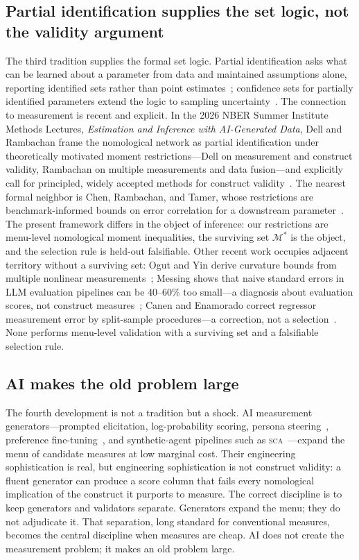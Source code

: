 \documentclass[10pt,letterpaper]{article}
\newcommand{\SCA}{\textsc{sca}}
\newcommand{\M}{\ensuremath{\mathcal{M}}}
\begin{document}
\subsection{Partial identification supplies the set logic, not the validity argument}
The third tradition supplies the formal set logic.
Partial identification asks what can be learned about a parameter from data and maintained assumptions alone, reporting identified sets rather than point estimates~\cite{manski2003,molinari2020}; confidence sets for partially identified parameters extend the logic to sampling uncertainty~\cite{imbensmanski2004,stoye2009}.
The connection to measurement is recent and explicit.
In the 2026 NBER Summer Institute Methods Lectures, \emph{Estimation and Inference with AI-Generated Data}, Dell and Rambachan frame the nomological network as partial identification under theoretically motivated moment restrictions---Dell on measurement and construct validity, Rambachan on multiple measurements and data fusion---and explicitly call for principled, widely accepted methods for construct validity~\cite{dellrambachan2026}.
The nearest formal neighbor is Chen, Rambachan, and Tamer, whose restrictions are benchmark-informed bounds on error correlation for a downstream parameter~\cite{chenrttamer2026}.
The present framework differs in the object of inference: our restrictions are menu-level nomological moment inequalities, the surviving set $\M^*$ is the object, and the selection rule is held-out falsifiable.
Other recent work occupies adjacent territory without a surviving set: Ogut and Yin derive curvature bounds from multiple nonlinear measurements~\cite{ogutyin2026}; Messing shows that naive standard errors in LLM evaluation pipelines can be 40--60\% too small---a diagnosis about evaluation scores, not construct measures~\cite{messing2026}; Canen and Enamorado correct regressor measurement error by split-sample procedures---a correction, not a selection~\cite{canenenamorado2026}.
None performs menu-level validation with a surviving set and a falsifiable selection rule.

\subsection{AI makes the old problem large}
The fourth development is not a tradition but a shock.
AI measurement generators---prompted elicitation, log-probability scoring, persona steering~\cite{disca2026}, preference fine-tuning~\cite{plural2026,palms2026}, and synthetic-agent pipelines such as \SCA{}~\cite{capra2025}---expand the menu of candidate measures at low marginal cost.
Their engineering sophistication is real, but engineering sophistication is not construct validity: a fluent generator can produce a score column that fails every nomological implication of the construct it purports to measure.
The correct discipline is to keep generators and validators separate.
Generators expand the menu; they do not adjudicate it.
That separation, long standard for conventional measures, becomes the central discipline when measures are cheap.
AI does not create the measurement problem; it makes an old problem large.
\end{document}
